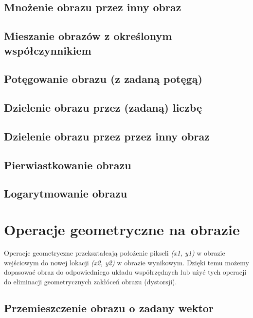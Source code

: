 \documentclass[a4paper,12pt]{book}
\begin{document}
\section{Mnożenie obrazu przez inny obraz}
\section{Mieszanie obrazów z określonym współczynnikiem}
\section{Potęgowanie obrazu (z zadaną potęgą)}
\section{Dzielenie obrazu przez (zadaną) liczbę}
\section{Dzielenie obrazu przez przez inny obraz}
\section{Pierwiastkowanie obrazu}
\section{Logarytmowanie obrazu}

\chapter{Operacje geometryczne na obrazie}
Operacje geometryczne przekształcają położenie pikseli \textit{(x1, y1)} w obrazie wejściowym do nowej lokacji \textit{(x2, y2)} w obrazie wynikowym. Dzięki temu możemy dopasować obraz do odpowiedniego układu współrzędnych lub użyć tych operacji do eliminacji geometrycznych zakłóceń obrazu (dystorsji). 
\section{Przemieszczenie obrazu o zadany wektor}
\end{document}

